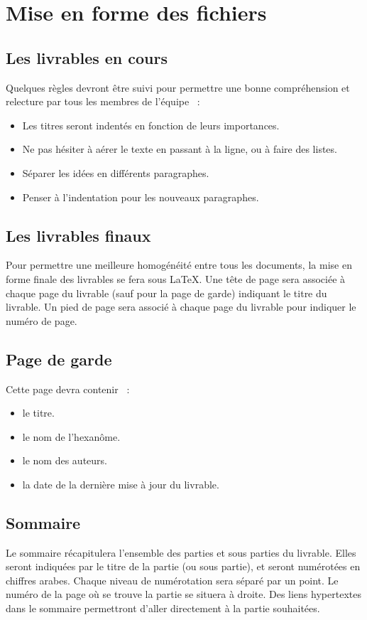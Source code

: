 \section{Mise en forme des fichiers}
\subsection{Les livrables en cours}
	Quelques règles devront être suivi pour permettre une bonne compréhension et relecture par tous les membres de l'équipe  :
\begin{itemize}
    \item Les titres seront indentés en fonction de leurs importances.
    \item Ne pas hésiter à aérer le texte en passant à la ligne, ou à faire des listes.
    \item Séparer les idées en différents paragraphes.
    \item Penser à l'indentation pour les nouveaux paragraphes.
\end{itemize}

\subsection{Les livrables finaux}
	Pour permettre une meilleure homogénéité entre tous les documents, la mise en forme finale des livrables se fera sous LaTeX. Une tête de page sera associée à chaque page du livrable (sauf pour la page de garde) indiquant le titre du livrable. Un pied de page sera associé à chaque page du livrable pour indiquer le numéro de page.


\subsection{Page de garde}
Cette page devra contenir  :
\begin{itemize}
    \item le titre.
    \item le nom de l'hexanôme.
    \item le nom des auteurs.
    \item la date de la dernière mise à jour du livrable.
\end{itemize}

\subsection{Sommaire}
	Le sommaire récapitulera l'ensemble des parties et sous parties du livrable. Elles seront indiquées par le titre de la partie (ou sous partie), et seront numérotées en chiffres arabes. Chaque niveau de numérotation sera séparé par un point. Le numéro de la page où se trouve la partie se situera à droite. Des liens hypertextes dans le sommaire permettront d'aller directement à la partie souhaitées.

